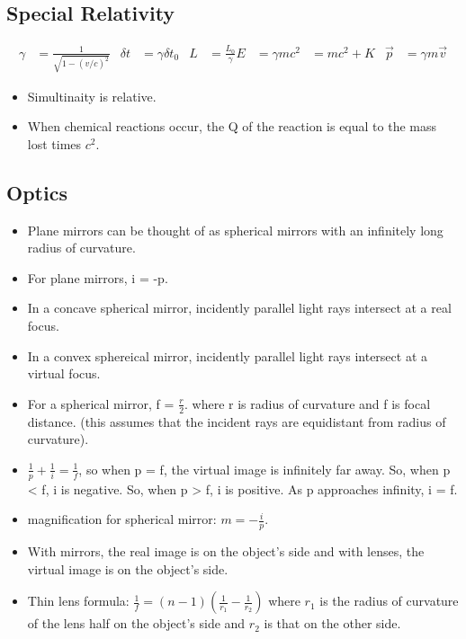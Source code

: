 \documentclass{article}
\begin{document}
    \subsection*{Special Relativity}
        \begin {align*}
        \gamma &= \frac{1}{\sqrt{1 - (v/c)^2}} & \delta t &= \gamma \delta t_0 & L &= \frac{L_0}{\gamma}
        E &= \gamma m c^2 &= m c^2 + K & \vec{p} &= \gamma m \vec{v}
        \end{align*}
        \begin{itemize}[leftmargin=\lindent]
        \item Simultinaity is relative.
        \item When chemical reactions occur, the Q of the reaction is equal to the mass lost times $c^2$.

        \end{itemize}
    \subsection*{Optics}
    \begin{itemize}[leftmargin=\lindent]
        \item Plane mirrors can be thought of as spherical mirrors with an infinitely long radius of curvature.
        \item For plane mirrors, i = -p.
        \item In a concave spherical mirror, incidently parallel light rays intersect at a real focus.
        \item In a convex sphereical mirror, incidently parallel light rays intersect at a virtual focus.
        \item For a spherical mirror, f = $\frac{r}{2}.$ where r is radius of curvature and f is focal distance.
              (this assumes that the incident rays are equidistant from radius of curvature).
        \item $ \frac{1}{p} + \frac{1}{i} = \frac{1}{f}$, so when p = f, the virtual image is infinitely far
        away. So, when p < f, i is negative. So, when p > f, i is positive. As p approaches infinity, i = f.
        \item magnification for spherical mirror: $m = - \frac{i}{p}.$
        \item With mirrors, the real image is on the object's side and with lenses, the virtual image is on
        the object's side.
        \item Thin lens formula: $\frac{1}{f} = (n - 1) ( \frac{1}{r_1} - \frac{1}{r_2} )$
        where $r_1$ is the radius of curvature of the lens half on the object's side and $r_2$ is that on the
        other side.
    \end{itemize}
\end{document}
